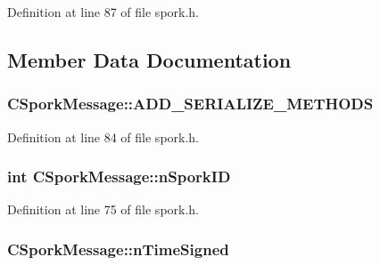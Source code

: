 Definition at line 87 of file spork.\+h.



\subsection{Member Data Documentation}
\hypertarget{class_c_spork_message_afcbd5a0f8bdeebe3794088bf29136071}{}
\subsubsection[{A\+D\+D\+\_\+\+S\+E\+R\+I\+A\+L\+I\+Z\+E\+\_\+\+M\+E\+T\+H\+O\+D\+S}]{\setlength{\rightskip}{0pt plus 5cm}C\+Spork\+Message\+::\+A\+D\+D\+\_\+\+S\+E\+R\+I\+A\+L\+I\+Z\+E\+\_\+\+M\+E\+T\+H\+O\+D\+S}\label{class_c_spork_message_afcbd5a0f8bdeebe3794088bf29136071}


Definition at line 84 of file spork.\+h.

\hypertarget{class_c_spork_message_a081216533339aed53adbb0dad2a78f73}{}
\subsubsection[{n\+Spork\+I\+D}]{\setlength{\rightskip}{0pt plus 5cm}int C\+Spork\+Message\+::n\+Spork\+I\+D}\label{class_c_spork_message_a081216533339aed53adbb0dad2a78f73}


Definition at line 75 of file spork.\+h.

\hypertarget{class_c_spork_message_a66a80692ffda8526efa272bb2847030b}{}
\subsubsection[{n\+Time\+Signed}]{ C\+Spork\+Message\+::n\+Time\+Signed}\label{class_c_spork_message_a66a80692ffda8526efa272bb2847030b}


